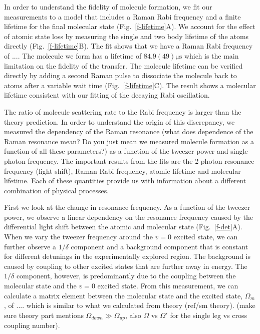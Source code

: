 \documentclass[aps,prl,twocolumn,groupedaddress]{revtex4-1}
\begin{document}
In order to understand the fidelity of molecule formation, we fit our measurements to a model that includes a Raman Rabi frequency and a finite lifetime for the final molecular state (Fig.~\ref{f-lifetime}A). We account for the effect of atomic state loss by measuring the single and two body lifetime of the atoms directly (Fig.~\ref{f-lifetime}B). The fit shows that we have a Raman Rabi frequency of $...$. The molecule we form has a lifetime of $84.9(49) \mathrm{\mu s}$ which is the main limitation on the fidelity of the transfer. The molecule lifetime can be verified directly by adding a second Raman pulse to dissociate the molecule back to atoms after a variable wait time (Fig.~\ref{f-lifetime}C). The result shows a molecular lifetime consistent with our fitting of the decaying Rabi oscillation.

The ratio of molecule scattering rate to the Rabi frequency is larger than the theory prediction. In order to understand the origin of this discrepancy, we measured the dependency of the Raman resonance (what does dependence of the Raman resonance mean? Do you just mean we measured molecule formation as a function of all these parameters?) as a function of the tweezer power and single photon frequency. The important results from the fits are the 2 photon resonance frequency (light shift), Raman Rabi frequency, atomic lifetime and molecular lifetime. Each of these quantities provide us with information about a different combination of physical processes.

First we look at the change in resonance frequency. As a function of the tweezer power, we observe a linear dependency on the resonance frequency caused by the differential light shift between the atomic and molecular state (Fig.~\ref{f-det}A). When we vary the tweezer frequency around the $v=0$ excited state, we can further observe a $1/\delta$ component and a background component that is constant for different detunings in the experimentally explored region. The background is caused by coupling to other excited states that are further away in energy. %
The $1/\delta$ component, however, is predominantly due to the coupling between the molecular state and the $ v =0 $ excited state. From this measurement, we can calculate a matrix element between the molecular state and the excited state, $ \Omega_m$, of $....$ which is similar to what we calculated from theory (ref/sm theory). (make sure theory part mentions $\Omega_{down}\gg\Omega_{up}$, also $\Omega$ vs $\Omega'$ for the single leg vs cross coupling number).
\end{document}
